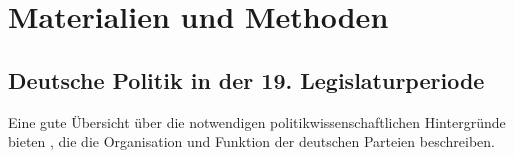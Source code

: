
\chapter{Materialien und Methoden} \label{ch:materialsAndMethods}








\section{Deutsche Politik in der 19. Legislaturperiode}

Eine gute Übersicht über die notwendigen politikwissenschaftlichen Hintergründe bieten \textcite{bukow_innerparteiliche_2013}, die die Organisation und Funktion der deutschen Parteien beschreiben.

